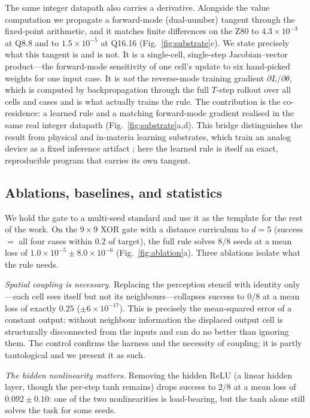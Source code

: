 The same integer datapath also carries a derivative. Alongside the value computation we propagate a forward-mode (dual-number) tangent \citep{wengert1964ad,griewank2008evaluating} through the fixed-point arithmetic, and it matches finite differences on the Z80 to $4.3\times10^{-3}$ at Q8.8 and to $1.5\times10^{-5}$ at Q16.16 (Fig.~\ref{fig:substrate}c). We state precisely what this tangent is and is not. It is a single-cell, single-step Jacobian--vector product---the forward-mode sensitivity of one cell's update to six hand-picked weights for one input case. It is \emph{not} the reverse-mode training gradient $\partial L/\partial\theta$, which is computed by backpropagation through the full $T$-step rollout over all cells and cases \citep{werbos1990bptt} and is what actually trains the rule. The contribution is the co-residence: a learned rule and a matching forward-mode gradient realised in the same real integer datapath (Fig.~\ref{fig:substrate}a,d). This bridge distinguishes the result from physical and in-materia learning substrates, which train an analog device as a fixed inference artifact \citep{wright2022deep,prezioso2015training}; here the learned rule is itself an exact, reproducible program that carries its own tangent.

\subsection{Ablations, baselines, and statistics}
\label{sec:ablation}

We hold the gate to a multi-seed standard and use it as the template for the rest of the work. On the $9\times9$ XOR gate with a distance curriculum to $d=5$ (success $=$ all four cases within $0.2$ of target), the full rule solves $8/8$ seeds at a mean loss of $1.0\times10^{-5}\pm8.0\times10^{-6}$ (Fig.~\ref{fig:ablation}a). Three ablations isolate what the rule needs.

\emph{Spatial coupling is necessary.} Replacing the perception stencil with identity only---each cell sees itself but not its neighbours---collapses success to $0/8$ at a mean loss of exactly $0.25$ ($\pm6\times10^{-17}$). This is precisely the mean-squared error of a constant output: without neighbour information the displaced output cell is structurally disconnected from the inputs and can do no better than ignoring them. The control confirms the harness and the necessity of coupling; it is partly tautological and we present it as such.

\emph{The hidden nonlinearity matters.} Removing the hidden ReLU (a linear hidden layer, though the per-step tanh remains) drops success to $2/8$ at a mean loss of $0.092\pm0.10$: one of the two nonlinearities is load-bearing, but the tanh alone still solves the task for some seeds.

